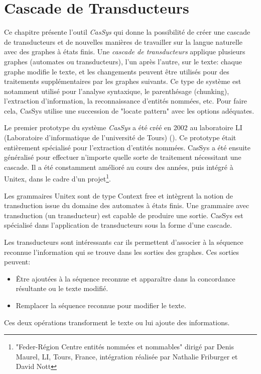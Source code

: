 \chapter{Cascade de Transducteurs}
\label{chap-cassys}

Ce chapitre présente l'outil \textit{CasSys} qui donne la possibilité de créer une cascade
de  transducteurs et de nouvelles manières de travailler sur la langue naturelle avec des 
graphes à états finis. Une \textit{cascade de transducteurs} 
applique plusieurs graphes (automates ou transducteurs), l'un après l'autre, sur le texte: chaque
graphe modifie le texte, et les changements peuvent être utilisés pour des traitements supplémentaires
par les graphes suivants. Ce type de  système est notamment utilisé pour l'analyse syntaxique, le parenthésage (chunking),
l'extraction d'information, la reconnaissance d'entités nommées, etc. Pour faire cela, CasSys utilise
une succession de "locate pattern" avec les options adéquates.

\bigskip
\noindent Le premier prototype du système \textit{CasSys}   a été créé en 2002 au 
laboratoire LI (Laboratoire d'informatique de l'université de Tours) (\cite{these-nathalie}). 
Ce prototype était entièrement spécialisé pour l'extraction d'entités nommées. CasSys a été  
ensuite généralisé pour effectuer n'importe quelle sorte de traitement nécessitant une cascade. 
Il a été constamment amélioré au cours des années, puis intégré à Unitex, dans le cadre d'un projet\footnote{"Feder-Région Centre entités nommées et nommables" 
dirigé par Denis Maurel, LI, Tours, France, intégration réalisée par Nathalie Friburger et
David Nott}.

\bigskip
\noindent Les grammaires Unitex sont de type Context free et intègrent la notion de transduction issue
du domaine des automates à états finis. Une grammaire avec transduction (un  transducteur) est
capable de produire une sortie. CasSys est spécialisé dans l'application de transducteurs sous
la forme d'une cascade.

\bigskip
\noindent
Les transducteurs sont intéressants car ils permettent d'associer à la séquence
reconnue l'information qui se trouve dans les sorties des graphes.
Ces  sorties peuvent:
\begin{itemize}
\item Être ajoutées à la séquence reconnue et apparaître dans la concordance résultante ou le texte modifié.
\item Remplacer la séquence reconnue pour modifier le texte.
\end{itemize}
\noindent Ces deux  opérations transforment le texte ou lui ajoute des informations.

